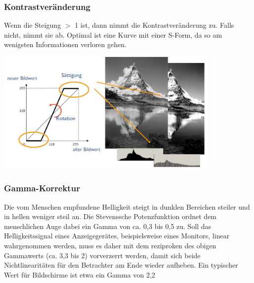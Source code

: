 \noindent{}


\subsubsection{Kontrastveränderung}
Wenn die Steigung $>$ 1 ist, dann nimmt die Kontrastveränderung zu. Falls nicht, nimmt sie ab. Optimal ist eine Kurve mit einer S-Form, da so am wenigsten Informationen verloren gehen.
\begin{center}
	\includegraphics[height=6cm,keepaspectratio]{images/sw01/Kontrastveraenderung.JPG}
\end{center}

\subsubsection{Gamma-Korrektur}
Die vom Menschen empfundene Helligkeit steigt in dunklen Bereichen steiler und in hellen weniger steil an. Die Stevenssche Potenzfunktion ordnet dem menschlichen Auge dabei ein Gamma von ca. 0,3 bis 0,5 zu. Soll das Helligkeitssignal eines Anzeigegerätes, beispielsweise eines Monitors, linear wahrgenommen werden, muss es daher mit dem reziproken des obigen Gammawerts (ca. 3,3 bis 2) vorverzerrt werden, damit sich beide Nichtlinearitäten für den Betrachter am Ende wieder aufheben. Ein typischer Wert für Bildschirme ist etwa ein Gamma von 2,2


